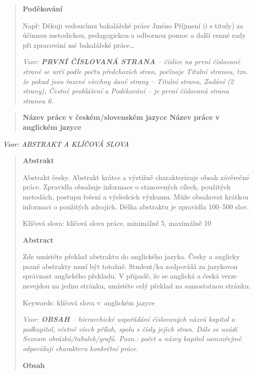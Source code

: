 \documentclass[
]{article}
\begin{document}
\begin{quote}
\textbf{Poděkování}

Např: Děkuji vedoucímu bakalářské práce Jméno Příjmení (i s tituly) za
účinnou metodickou, pedagogickou a odbornou pomoc a další cenné rady při
zpracování mé bakalářské práce\ldots{}

\newpage
\emph{Vzor: \textbf{PRVNÍ ČÍSLOVANÁ STRANA} -- číslice na první
číslované straně se určí podle počtu předchozích stran, počínaje Titulní
stranou, tzn. že pokud jsou řazené všechny dané strany -- Titulní
strana, Zadání (2 strany), Čestné prohlášení a Poděkování -- je první
číslovaná strana stranou 6.}
\end{quote}

\begin{quote}
\textbf{Název práce v českém/slovenském jazyce Název práce v anglickém
jazyce}
\end{quote}

\emph{Vzor: ABSTRAKT A KLÍČOVÁ SLOVA}

\begin{quote}
\textbf{Abstrakt}

Abstrakt česky. Abstrakt krátce a výstižně charakterizuje obsah
závěrečné práce. Zpravidla obsahuje informace o stanovených cílech,
použitých metodách, postupu řešení a výsledcích výzkumu. Může obsahovat
krátkou informaci o použitých zdrojích. Délka abstraktu je zpravidla
100--500 slov.

Klíčová slova: klíčová slova práce, minimálně 5, maximálně 10

\textbf{Abstract}

Zde umístěte překlad abstraktu do anglického jazyka. Česky a anglicky
psané abstrakty musí být totožné. Student/ka zodpovídá za jazykovou
správnost anglického překladu. V případě, že se anglická a česká verze
nevejdou na jednu stránku, umístěte celý překlad na samostatnou stránku.

Keywords: klíčová slova v~anglickém jazyce

\newpage
\emph{Vzor: \textbf{OBSAH} -- hierarchické uspořádání číslovaných názvů
kapitol a podkapitol, včetně všech příloh, spolu s čísly jejich stran.
Dále se uvádí Seznam obrázků/tabulek/grafů. Pozn.: počet a názvy kapitol
samozřejmě odpovídají charakteru konkrétní práce.}

\textbf{Obsah}
\end{quote}

\hypertarget{section}{%
\section{}\label{section}}
\end{document}
